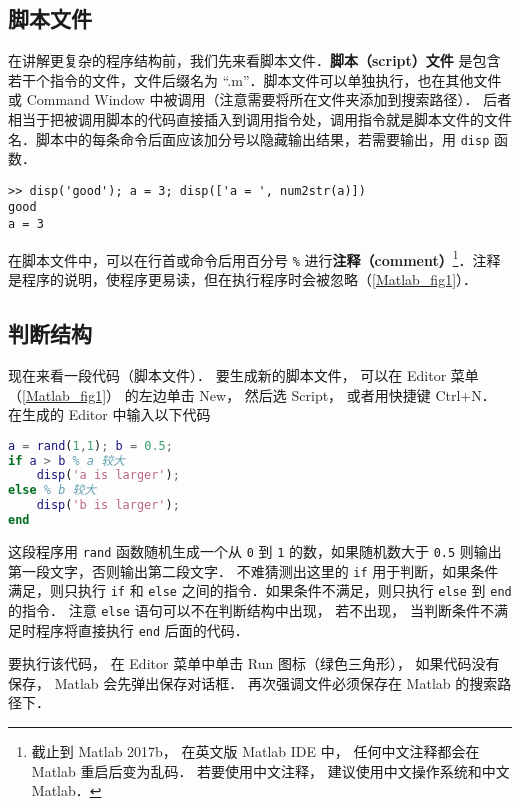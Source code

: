 

\subsection{脚本文件}
在讲解更复杂的程序结构前，我们先来看脚本文件．\textbf{脚本（script）文件} 是包含若干个指令的文件，文件后缀名为 “.m”．脚本文件可以单独执行，也在其他文件或 Command Window 中被调用（注意需要将所在文件夹添加到搜索路径）． 后者相当于把被调用脚本的代码直接插入到调用指令处，调用指令就是脚本文件的文件名．脚本中的每条命令后面应该加分号以隐藏输出结果，若需要输出，用 \lstinline|disp| 函数．
\begin{lstlisting}[language=matlabC]
>> disp('good'); a = 3; disp(['a = ', num2str(a)])
good
a = 3
\end{lstlisting}
在脚本文件中，可以在行首或命令后用百分号 \lstinline|%| 进行\textbf{注释（comment）}\footnote{截止到 Matlab 2017b， 在英文版 Matlab IDE 中， 任何中文注释都会在 Matlab 重启后变为乱码． 若要使用中文注释， 建议使用中文操作系统和中文 Matlab．}．注释是程序的说明，使程序更易读，但在执行程序时会被忽略（\autoref{Matlab_fig1}）．

\subsection{判断结构}
现在来看一段代码（脚本文件）． 要生成新的脚本文件， 可以在 Editor 菜单（\autoref{Matlab_fig1}） 的左边单击 New， 然后选 Script， 或者用快捷键 Ctrl+N． 在生成的 Editor 中输入以下代码

\begin{lstlisting}[language=matlab]
a = rand(1,1); b = 0.5;
if a > b % a 较大
    disp('a is larger');
else % b 较大
    disp('b is larger');
end
\end{lstlisting}

这段程序用 \lstinline|rand| 函数随机生成一个从 \lstinline|0| 到 \lstinline|1| 的数，如果随机数大于 \lstinline|0.5| 则输出第一段文字，否则输出第二段文字． 不难猜测出这里的 \lstinline|if| 用于判断，如果条件满足，则只执行 \lstinline|if| 和 \lstinline|else| 之间的指令．如果条件不满足，则只执行 \lstinline|else| 到 \lstinline|end| 的指令． 注意 \lstinline|else| 语句可以不在判断结构中出现， 若不出现， 当判断条件不满足时程序将直接执行 \lstinline|end| 后面的代码．

要执行该代码， 在 Editor 菜单中单击 Run 图标（绿色三角形）， 如果代码没有保存， Matlab 会先弹出保存对话框． 再次强调文件必须保存在 Matlab 的搜索路径下．

